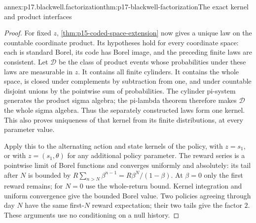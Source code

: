 \begin{annexitem}{annex:p17.blackwell.factorization}{thm:p17-blackwell-factorization}{The exact kernel and product interfaces}
\begin{proof}
For fixed \(z\), \cref{thm:p15-coded-space-extension} now
gives a unique law on the countable coordinate product. Its
hypotheses hold for every coordinate space: each is standard
Borel, its code has Borel image, and the preceding finite laws
are consistent. Let \(\mathcal D\) be the class of product events
whose probabilities under these laws are measurable in \(z\).
It contains all finite cylinders. It contains the whole space,
is closed under complements by subtraction from one, and under
countable disjoint unions by the pointwise sum of probabilities.
The cylinder pi-system generates the product sigma algebra;
the pi-lambda theorem therefore makes \(\mathcal D\) the whole
sigma algebra. Thus the separately constructed laws form one
kernel. This also proves uniqueness of that kernel from its
finite distributions, at every parameter value.

Apply this to the alternating action and state kernels of the
policy, with \(z=s_1\), or with \(z=(s_1,\theta)\) for any
additional policy parameter. The reward series is a pointwise
limit of Borel functions and converges uniformly and absolutely:
its tail after \(N\) is bounded by
\(R\sum_{n>N}\beta^{n-1}=R\beta^N/(1-\beta)\).
At \(\beta=0\) only the first reward remains; for \(N=0\)
use the whole-return bound. Kernel integration and uniform
convergence give the bounded Borel value. Two policies agreeing
through day \(N\) have the same first-\(N\) reward expectation;
their two tails give the factor \(2\). These arguments use no
conditioning on a null history.
\end{proof}
\end{annexitem}

